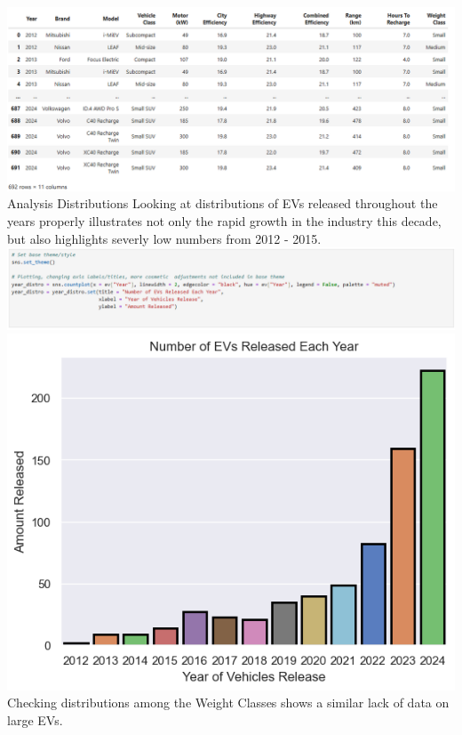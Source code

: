 \documentclass{article}
\begin{document}
{  \includegraphics[width=\textwidth]{table_01.png}
  \newpage
  \Large Analysis
  \newline \newline
  \large Distributions
  \newline \newline
  \normalsize Looking at distributions of EVs released throughout the years properly illustrates not only the rapid growth
  in the industry this decade, but also highlights severly low numbers from 2012 - 2015.
  \newline \newline
  \includegraphics[width=\textwidth]{code_03.png}
  \includegraphics[width=\textwidth]{graph_01.png}
  \newpage
  Checking distributions among the Weight Classes shows a similar lack of data on large EVs.
}
\end{document}
